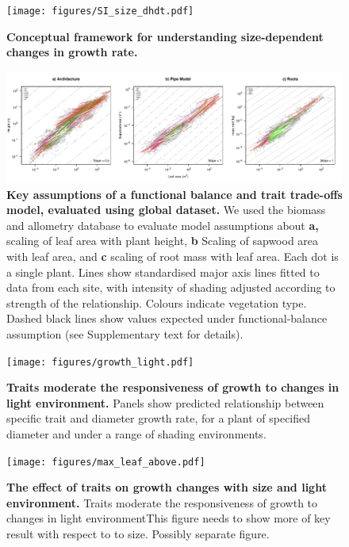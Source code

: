 \documentclass[12pt, a4paper]{article}
\makeatletter
\def\maxwidth{\ifdim\Gin@nat@width>\linewidth\linewidth
\else\Gin@nat@width\fi}
\let\Oldincludegraphics\includegraphics
\renewcommand{\includegraphics}[1]{\Oldincludegraphics[width=\maxwidth]{#1}}
\makeatother
\begin{document}
\newpage

\begin{figure}[htbp]
\centering
\texttt{[image: figures/SI\_size\_dhdt.pdf]}
\caption{\textbf{Conceptual framework for understanding size-dependent
changes in growth rate.} \label{f-conceptual}}
\end{figure}

\newpage

\begin{figure}[htbp]
\centering
\includegraphics{figs/allometry.pdf}
\caption{\textbf{Key assumptions of a functional balance and trait
trade-offs model, evaluated using global dataset.} We used the biomass and
allometry database to evaluate model assumptions about \textbf{a,}
scaling of leaf area with plant height, \textbf{b} Scaling of sapwood
area with leaf area, and \textbf{c} scaling of root mass with leaf area.
Each dot is a single plant. Lines show standardised major axis lines
fitted to data from each site, with intensity of shading adjusted
according to strength of the relationship. Colours indicate vegetation
type. Dashed black lines show values expected under functional-balance
assumption (see Supplementary text for details). \label{f-assumptions}}
\end{figure}

\newpage

\begin{figure}[htbp]
\centering
\texttt{[image: figures/growth\_light.pdf]}
\caption{\textbf{Traits moderate the responsiveness of growth to changes
in light environment.} Panels show predicted relationship between
specific trait and diameter growth rate, for a plant of specified
diameter and under a range of shading environments.
\label{f-growth_light}}
\end{figure}

\newpage

\begin{figure}[htbp]
\centering
\texttt{[image: figures/max\_leaf\_above.pdf]}
\caption{\textbf{The effect of traits on growth changes with size and
light environment.} Traits moderate the responsiveness of growth to changes in light
environmentThis figure needs to show more of key result with respect to to size.
Possibly separate figure. \label{f-shifts}}
\end{figure}
\end{document}
